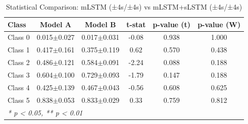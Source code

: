 \begin{table}[htbp]
\centering
\caption{Statistical Comparison: mLSTM (±4s/±4s) vs mLSTM+sLSTM (±4s/±4s)}
\label{tab:comparison_class_mlstm_±4s_±4s_vs_mlstmslstm_±4s_±4s}
\begin{tabular}{lccccc}
\toprule
\textbf{Class} & \textbf{Model A} & \textbf{Model B} & \textbf{t-stat} & \textbf{p-value (t)} & \textbf{p-value (W)} \\
\midrule
Class 0 & 0.015$\pm$0.027 & 0.017$\pm$0.031 & -0.08 & 0.938 & 1.000 \\
Class 1 & 0.417$\pm$0.161 & 0.375$\pm$0.119 & 0.62 & 0.570 & 0.438 \\
Class 2 & 0.486$\pm$0.121 & 0.584$\pm$0.091 & -2.24 & 0.088 & 0.188 \\
Class 3 & 0.604$\pm$0.100 & 0.729$\pm$0.093 & -1.79 & 0.147 & 0.188 \\
Class 4 & 0.425$\pm$0.139 & 0.467$\pm$0.043 & -0.56 & 0.608 & 0.625 \\
Class 5 & 0.838$\pm$0.053 & 0.833$\pm$0.029 & 0.33 & 0.759 & 0.812 \\
\bottomrule
\multicolumn{6}{l}{\textit{* p < 0.05, ** p < 0.01}} \\
\end{tabular}
\end{table}